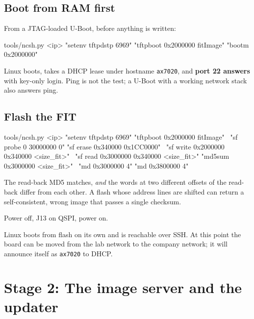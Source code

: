 \documentclass[11pt,a4paper,oneside]{article}
\newcommand{\cmd}[1]{\texttt{#1}}
\begin{document}
\subsection{Boot from RAM first}

From a JTAG-loaded U-Boot, before anything is written:

\begin{shell}
tools/ncsh.py <ip> "setenv tftpdstp 6969" "tftpboot 0x2000000 fitImage" "bootm 0x2000000"
\end{shell}

\begin{checkpoint}
Linux boots, takes a DHCP lease under hostname \cmd{ax7020}, and
\textbf{port 22 answers} with key-only login. Ping is not the test; a U-Boot
with a working network stack also answers ping.
\end{checkpoint}

\subsection{Flash the FIT}

\begin{shell}
tools/ncsh.py <ip> "setenv tftpdstp 6969" "tftpboot 0x2000000 fitImage" \
  "sf probe 0 30000000 0" "sf erase 0x340000 0x1CC0000" \
  "sf write 0x2000000 0x340000 <size_fit>" \
  "sf read 0x3000000 0x340000 <size_fit>" "md5sum 0x3000000 <size_fit>" \
  "md 0x3000000 4" "md 0x3800000 4"
\end{shell}

\begin{checkpoint}
The read-back MD5 matches, \emph{and} the words at two different offsets of
the read-back differ from each other. A flash whose address lines are shifted
can return a self-consistent, wrong image that passes a single checksum.
\end{checkpoint}

Power off, J13 on QSPI, power on.

\begin{checkpoint}
Linux boots from flash on its own and is reachable over SSH. At this point
the board can be moved from the lab network to the company network; it will
announce itself as \cmd{ax7020} to DHCP.
\end{checkpoint}

\section{Stage 2: The image server and the updater}
\end{document}
